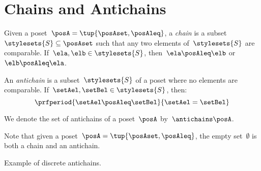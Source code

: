 
\section{Chains and Antichains}
\label{sec:chains-antichains}

\begin{definition}
	\label{def:chain}
	Given a poset~$\posA = \tup{\posAset, \posAleq}$, a \emph{chain} is a subset~$\stylesets{S} \subseteq \posAset$ such that any two elements of~$\stylesets{S}$ are comparable.
	If~$\ela, \elb \in \stylesets{S}$, then~$\ela \posAleq \elb$ or~$\elb \posAleq \ela$.
\end{definition}

\begin{definition}
	\label{def:antichain}
	An \emph{antichain} is a subset~$\stylesets{S}$ of a poset where no elements are comparable.
	If~$\setAel,\setBel \in \stylesets{S}$, then:
	\begin{equation}
		\prfperiod{\setAel \posAleq \setBel}{\setAel=\setBel}
	\end{equation}
\end{definition}

We denote the set of antichains of a poset~$\posA$ by~$\antichains\posA$.

\begin{remark}
	Note that given a poset~$\posA=\tup{\posAset,\posAleq}$, the empty set~$\emptyset$ is both a chain and an antichain.
\end{remark}

\begin{marginfigure}
	\centering
	\caption{Example of discrete antichains.}
	\label{fig:antichain}
\end{marginfigure}

